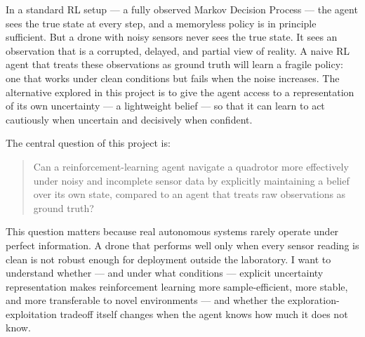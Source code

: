 \documentclass[11pt]{article}
\begin{document}
In a standard RL setup — a fully observed Markov Decision Process — the agent sees the true state at every step, and a memoryless policy is in principle sufficient. But a drone with noisy sensors never sees the true state. It sees an observation that is a corrupted, delayed, and partial view of reality. A naive RL agent that treats these observations as ground truth will learn a fragile policy: one that works under clean conditions but fails when the noise increases. The alternative explored in this project is to give the agent access to a representation of its own uncertainty — a lightweight belief — so that it can learn to act cautiously when uncertain and decisively when confident.

The central question of this project is:

\begin{quote}
Can a reinforcement-learning agent navigate a quadrotor more effectively under noisy and incomplete sensor data by explicitly maintaining a belief over its own state, compared to an agent that treats raw observations as ground truth?
\end{quote}

This question matters because real autonomous systems rarely operate under perfect information. A drone that performs well only when every sensor reading is clean is not robust enough for deployment outside the laboratory. I want to understand whether — and under what conditions — explicit uncertainty representation makes reinforcement learning more sample-efficient, more stable, and more transferable to novel environments — and whether the exploration-exploitation tradeoff itself changes when the agent knows how much it does not know.

\newpage



\end{document}
